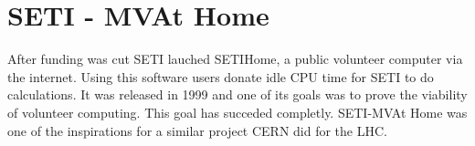 \section{SETI - MVAt Home}

After funding was cut SETI lauched SETI\MVAt Home, a public volunteer computer 
via the internet. Using this software users donate idle CPU time for SETI to do 
calculations\cite{www-hid-sp18-601-sathome-about}. It was released in 1999 and 
one of its goals was to prove the 
viability of volunteer computing. This goal has succeded completly. SETI-MVAt 
Home was one of the inspirations for a similar project CERN did for the LHC.